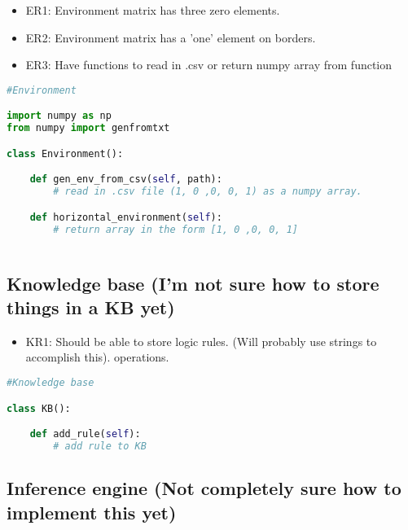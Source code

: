 \documentclass{article}
\begin{document}
\begin{itemize}
    \item ER1: Environment matrix has three zero elements.
    \item ER2: Environment matrix has a 'one' element on borders.
    \item ER3: Have functions to read in .csv or return numpy array from function
\end{itemize}

\begin{lstlisting}[language=Python, caption=Environment class outline]
#Environment

import numpy as np
from numpy import genfromtxt

class Environment():

    def gen_env_from_csv(self, path):
        # read in .csv file (1, 0 ,0, 0, 1) as a numpy array.

    def horizontal_environment(self):
        # return array in the form [1, 0 ,0, 0, 1]
    
\end{lstlisting}


\subsection{Knowledge base (I'm not sure how to store things in a KB yet)} 

\begin{itemize}
    \item KR1: Should be able to store logic rules. (Will probably use strings to accomplish this).
 operations.
\end{itemize}


\begin{lstlisting}[language=Python, caption=Knowledge base class outline]
#Knowledge base

class KB():

    def add_rule(self):
        # add rule to KB

\end{lstlisting}




\subsection{Inference engine (Not completely sure how to implement this yet)}
\end{document}
